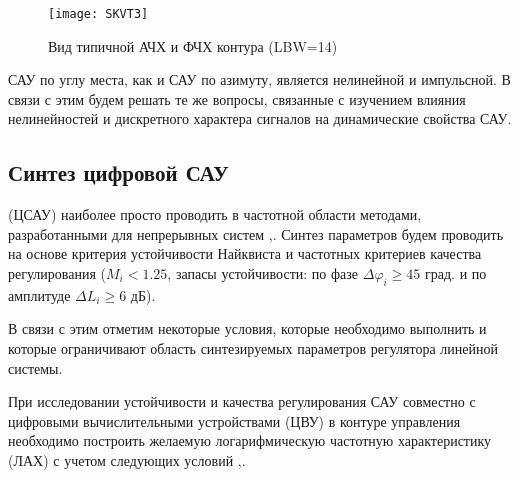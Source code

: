 \begin{figure}[ht]
	\centering
	\texttt{[image: SKVT3]} 
	\caption{Вид типичной АЧХ и ФЧХ контура (LBW=14) \cite[]{1310HM025}}
	\label{fig:SKVT3}
\end{figure}

САУ по углу места, как и САУ по азимуту, является нелинейной и импульсной. В связи с этим будем решать те же вопросы, связанные с изучением влияния нелинейностей и дискретного характера сигналов на динамические свойства САУ. \par

\subsection{Синтез цифровой САУ } \label{subsec:ch4/sect4/sub3}

(ЦСАУ) наиболее просто проводить в частотной области методами, разработанными для непрерывных систем \cite{Bessekerski},\cite{Karpov29}. Синтез параметров будем проводить на основе  критерия  устойчивости Найквиста и частотных критериев качества регулирования   ($M_i < 1.25$, запасы устойчивости: по фазе $\varDelta \varphi_i \geq 45 $ град. и по амплитуде $\varDelta L_i \geq 6$ дБ).\par

В связи с этим отметим некоторые условия, которые необходимо выполнить и которые ограничивают область синтезируемых параметров регулятора линейной системы.\par

При исследовании устойчивости и качества регулирования САУ совместно с цифровыми вычислительными устройствами (ЦВУ) в контуре управления необходимо построить желаемую логарифмическую частотную характеристику (ЛАХ) с учетом следующих условий \cite{Bessekerski},\cite{Karpov29}.\par

